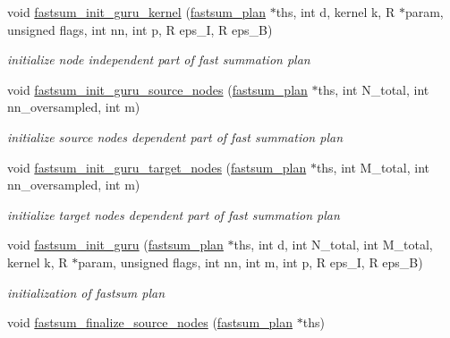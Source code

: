 \begin{DoxyCompactItemize}
\item 
void \hyperlink{group__applications__fastsum_ga547fd44b7bdb6906b95efc246a3179b8}{fastsum\-\_\-init\-\_\-guru\-\_\-kernel} (\hyperlink{group__applications__fastsum_gad953252f6b309404991c4afc7b98b34b}{fastsum\-\_\-plan} $\ast$ths, int d, kernel k, R $\ast$param, unsigned flags, int nn, int p, R eps\-\_\-\-I, R eps\-\_\-\-B)
\begin{DoxyCompactList}\small\item\em initialize node independent part of fast summation plan \end{DoxyCompactList}\item 
void \hyperlink{group__applications__fastsum_gadf095a8eb7937eb97cd7776b8ef42cb0}{fastsum\-\_\-init\-\_\-guru\-\_\-source\-\_\-nodes} (\hyperlink{group__applications__fastsum_gad953252f6b309404991c4afc7b98b34b}{fastsum\-\_\-plan} $\ast$ths, int N\-\_\-total, int nn\-\_\-oversampled, int m)
\begin{DoxyCompactList}\small\item\em initialize source nodes dependent part of fast summation plan \end{DoxyCompactList}\item 
void \hyperlink{group__applications__fastsum_ga229081e0a9387c446b457bf9dd383261}{fastsum\-\_\-init\-\_\-guru\-\_\-target\-\_\-nodes} (\hyperlink{group__applications__fastsum_gad953252f6b309404991c4afc7b98b34b}{fastsum\-\_\-plan} $\ast$ths, int M\-\_\-total, int nn\-\_\-oversampled, int m)
\begin{DoxyCompactList}\small\item\em initialize target nodes dependent part of fast summation plan \end{DoxyCompactList}\item 
void \hyperlink{group__applications__fastsum_ga4892832b81aaae7dd2e0e088043ee2a2}{fastsum\-\_\-init\-\_\-guru} (\hyperlink{group__applications__fastsum_gad953252f6b309404991c4afc7b98b34b}{fastsum\-\_\-plan} $\ast$ths, int d, int N\-\_\-total, int M\-\_\-total, kernel k, R $\ast$param, unsigned flags, int nn, int m, int p, R eps\-\_\-\-I, R eps\-\_\-\-B)
\begin{DoxyCompactList}\small\item\em initialization of fastsum plan \end{DoxyCompactList}\item 
void \hyperlink{group__applications__fastsum_gaeb217c3abf2d63e1640468bd8f82b306}{fastsum\-\_\-finalize\-\_\-source\-\_\-nodes} (\hyperlink{group__applications__fastsum_gad953252f6b309404991c4afc7b98b34b}{fastsum\-\_\-plan} $\ast$ths)

\end{DoxyCompactItemize}

